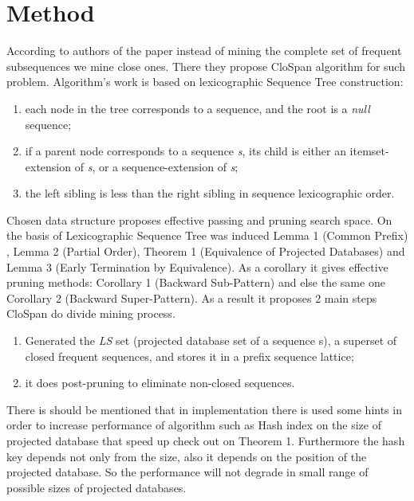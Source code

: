 \documentclass[journal]{IEEEtran}
\begin{document}
\section{Method}
According to authors of the paper \cite{CloSpan} instead of mining the complete set of frequent subsequences we mine close ones. There they propose CloSpan algorithm for such problem. Algorithm's work is based on lexicographic Sequence Tree construction:
\begin{enumerate}
\item each node in the tree corresponds to a sequence, and the root is a {\it null} sequence;
\item if a parent node corresponds to a sequence {\it s}, its child is either an itemset-extension of {\it s}, or a sequence-extension of {\it s};
\item the left sibling is less than the right sibling in sequence lexicographic order.
\end{enumerate}
Chosen data structure proposes effective passing and pruning search space. On the basis of Lexicographic Sequence Tree was induced Lemma 1 (Common Prefix) , Lemma 2 (Partial Order), Theorem 1 (Equivalence of Projected Databases) and Lemma 3 (Early Termination by Equivalence). As a corollary it gives effective pruning methods: Corollary 1 (Backward Sub-Pattern) and else the same one Corollary 2 (Backward Super-Pattern). As a result it proposes 2 main steps CloSpan do divide mining process.
\begin{enumerate}
\item Generated the {\it LS} set (projected database set of a sequence s), a superset of closed frequent sequences, and stores it in a prefix sequence lattice;
\item it does post-pruning to eliminate non-closed sequences.
\end{enumerate}
There is should be mentioned that in implementation there is used some hints in order to increase performance of algorithm such as Hash index on the size of projected database that speed up check out on Theorem 1. Furthermore the hash key depends not only from the size, also it depends on the position of the projected database. So the performance will not degrade  in small range of possible sizes of projected databases.
\end{document}
